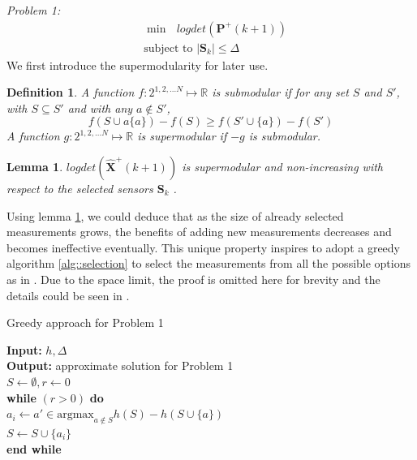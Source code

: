 \documentclass[conference]{IEEEtran}
\newtheorem{lemma}{Lemma}
\newtheorem{definition}{Definition}
\begin{document}
\emph{Problem 1:}
\begin{equation}
\begin{split}
&\min   \text{   } logdet(\boldsymbol{P}^+(k+1))
\\
&\text{subject to } |\boldsymbol{S}_k| \leq \Delta
\end{split}
\label{equ::opt_1}
\end{equation}
We first introduce the supermodularity for later use.
\begin{definition}
	A function $f:2^{1,2,...N} \mapsto \mathbb{R}$ is submodular if for any set $S$ and $S'$, with $S\subseteq S'$ and with any $a\notin S'$,
	\begin{equation*}
		f(S \cup a\{a\}) - f(S) \geq f(S' \cup \{a\}) - f(S')
	\end{equation*}
	A function $g:2^{1,2,...N} \mapsto \mathbb{R}$ is supermodular if $-g$ is submodular.
\end{definition}
\begin{lemma}
	$logdet(\hat{\boldsymbol{X}}^+(k+1))$ is supermodular and non-increasing with respect to the selected sensors $\boldsymbol{S}_k$ \cite{tzoumas2016sensor}.
	\label{lemma::1}
\end{lemma}
Using lemma \ref{lemma::1}, we could deduce that as the size of already selected measurements grows, the benefits of adding new measurements decreases and becomes ineffective eventually.
This unique property inspires to adopt a greedy algorithm \ref{alg::selection} to select the measurements from all the possible options as in \cite{tzoumas2016sensor}.
Due to the space limit, the proof is omitted here for brevity and the details could be seen in \cite{tzoumas2016sensor,tzoumas2018selecting}.

\begin{algorithm}
	\caption{Greedy approach for Problem 1}
	\textbf{Input:} $h,\Delta$ \\
	\textbf{Output: } approximate solution for Problem 1 \\
	$S \leftarrow \emptyset, r \leftarrow 0$\\
	\textbf{while} $(r>0)$ \textbf{do} \\
		$a_i \leftarrow a'\in \text{argmax}_{a\notin S} h(S) - h(S\cup \{a\})$ \\
		$S \leftarrow S \cup \{a_i\}$\\
	\textbf{end while}
	\label{alg::selection}
\end{algorithm}
\end{document}
